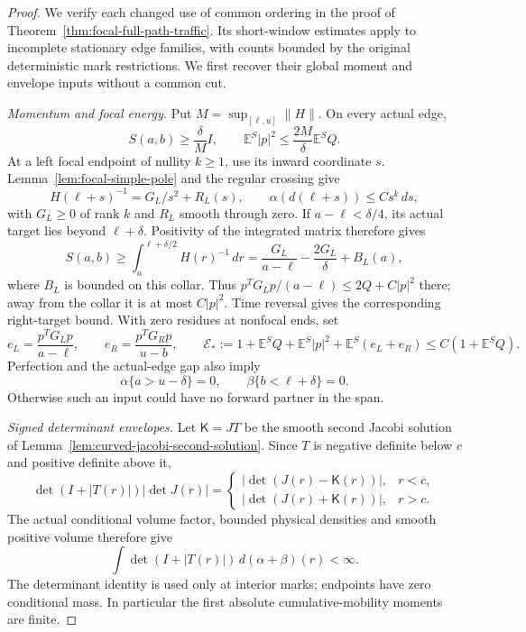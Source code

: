 \documentclass[11pt,reqno]{amsart}
\theoremstyle{definition}
\theoremstyle{remark}
\numberwithin{equation}{section}
\newcommand{\E}{\mathbb E}
\begin{document}
\begin{proof}
We verify each changed use of common ordering in the proof of
Theorem~\ref{thm:focal-full-path-traffic}. Its short-window estimates
apply to incomplete stationary edge families, with counts bounded by
the original deterministic mark restrictions. We first recover their
global moment and envelope inputs without a common cut.

\emph{Momentum and focal energy.}
Put \(M=\sup_{[\ell,u]}\|H\|\). On every actual edge,
\begin{equation}
\label{eq:interleaved-momentum-bound}
 S(a,b)\ge\frac\delta M I,
 \qquad \E^S|p|^2\le\frac{2M}{\delta}\E^S Q.
\end{equation}
At a left focal endpoint of nullity \(k\ge1\), use its inward
coordinate \(s\). Lemma~\ref{lem:focal-simple-pole} and the regular
crossing give
\[
 H(\ell+s)^{-1}=G_L/s^2+R_L(s),\qquad
 \alpha(d(\ell+s))\le Cs^k\,ds,
\]
with \(G_L\ge0\) of rank \(k\) and \(R_L\) smooth through zero.
If \(a-\ell<\delta/4\), its actual target lies beyond
\(\ell+\delta\). Positivity of the integrated matrix therefore gives
\[
 S(a,b)\ge\int_a^{\ell+\delta/2}H(r)^{-1}\,dr
       =\frac{G_L}{a-\ell}-\frac{2G_L}{\delta}+B_L(a),
\]
where \(B_L\) is bounded on this collar. Thus
\(p^TG_Lp/(a-\ell)\le2Q+C|p|^2\) there; away from the collar
it is at most \(C|p|^2\). Time reversal gives the corresponding
right-target bound. With zero residues at nonfocal ends, set
\begin{equation}
\label{eq:interleaved-focal-energy}
 e_L=\frac{p^TG_Lp}{a-\ell},\qquad
 e_R=\frac{p^TG_Rp}{u-b},\qquad
 \mathcal E_*:=1+\E^S Q+\E^S|p|^2+\E^S(e_L+e_R)
                  \le C(1+\E^S Q).
\end{equation}
Perfection and the actual-edge gap also imply
\begin{equation}
\label{eq:interleaved-opposite-end-margins}
 \alpha\{a>u-\delta\}=0,\qquad
 \beta\{b<\ell+\delta\}=0.
\end{equation}
Otherwise such an input could have no forward partner in the span.

\emph{Signed determinant envelopes.}
Let \(\mathsf K=JT\) be the smooth second Jacobi solution of
Lemma~\ref{lem:curved-jacobi-second-solution}. Since \(T\) is negative
definite below \(c\) and positive definite above it,
\[
 \det(I+|T(r)|)|\det J(r)|=
 \begin{cases}
 |\det(J(r)-\mathsf K(r))|,&r<c,\\
 |\det(J(r)+\mathsf K(r))|,&r>c.
 \end{cases}
\]
The actual conditional volume factor, bounded physical densities and
smooth positive volume therefore give
\begin{equation}
\label{eq:interleaved-signed-determinant}
 \int\det(I+|T(r)|)\,d(\alpha+\beta)(r)<\infty.
\end{equation}
The determinant identity is used only at interior marks; endpoints
have zero conditional mass. In particular the first absolute
cumulative-mobility moments are finite.


\end{proof}
\end{document}

